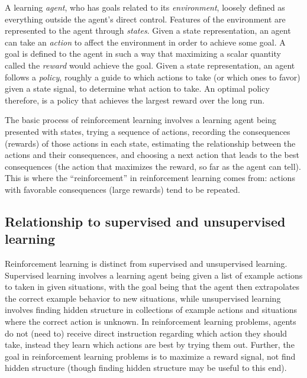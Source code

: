 \documentclass[12pt]{article}
\begin{document}
A learning \emph{agent}, who has goals related to its \emph{environment}, loosely defined as everything outside the agent's direct control. Features of the environment are represented to the agent through \emph{states}. Given a state representation, an agent can take an \emph{action} to affect the environment in order to achieve some goal. A goal is defined to the agent in such a way that maximizing a scalar quantity called the \emph{reward} would achieve the goal. Given a state representation, an agent follows a \emph{policy}, roughly a guide to which actions to take (or which ones to favor) given a state signal, to determine what action to take. An optimal policy therefore, is a policy that achieves the largest reward over the long run.

The basic process of reinforcement learning involves a learning agent being presented with states, trying a sequence of actions, recording the consequences (rewards) of those actions in each state, estimating the relationship between the actions and their consequences, and choosing a next action that leads to the best consequences (the action that maximizes the reward, so far as the agent can tell). This is where the ``reinforcement'' in reinforcement learning comes from: actions with favorable consequences (large rewards) tend to be repeated.


\subsection{Relationship to supervised and unsupervised learning} %
\label{sub:relationship_to_supervise_and_unsupervised_learning}

Reinforcement learning is distinct from supervised and unsupervised learning. Supervised learning involves a learning agent being given a list of example actions to taken in given situations, with the goal being that the agent then extrapolates the correct example behavior to new situations, while unsupervised learning involves finding hidden structure in collections of example actions and situations where the correct action is unknown. In reinforcement learning problems, agents do not (need to) receive direct instruction regarding which action they should take, instead they learn which actions are best by trying them out. Further, the goal in reinforcement learning problems is to maximize a reward signal, not find hidden structure (though finding hidden structure may be useful to this end).
\end{document}

